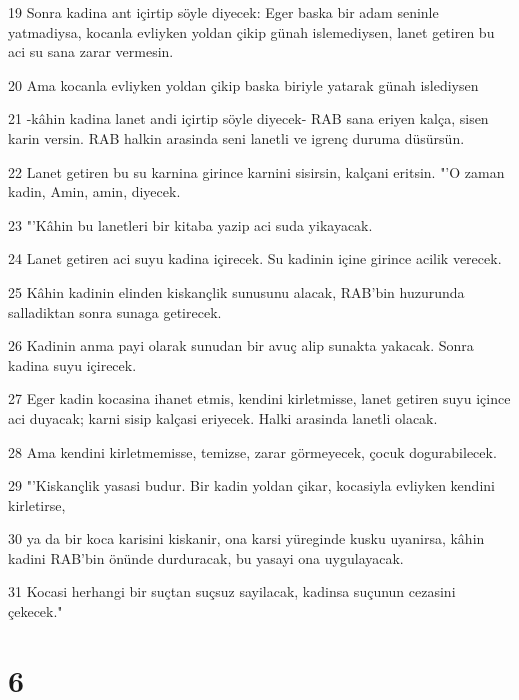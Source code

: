 \par 19 Sonra kadina ant içirtip söyle diyecek: Eger baska bir adam seninle yatmadiysa, kocanla evliyken yoldan çikip günah islemediysen, lanet getiren bu aci su sana zarar vermesin.
\par 20 Ama kocanla evliyken yoldan çikip baska biriyle yatarak günah islediysen
\par 21 -kâhin kadina lanet andi içirtip söyle diyecek- RAB sana eriyen kalça, sisen karin versin. RAB halkin arasinda seni lanetli ve igrenç duruma düsürsün.
\par 22 Lanet getiren bu su karnina girince karnini sisirsin, kalçani eritsin. "'O zaman kadin, Amin, amin, diyecek.
\par 23 "'Kâhin bu lanetleri bir kitaba yazip aci suda yikayacak.
\par 24 Lanet getiren aci suyu kadina içirecek. Su kadinin içine girince acilik verecek.
\par 25 Kâhin kadinin elinden kiskançlik sunusunu alacak, RAB'bin huzurunda salladiktan sonra sunaga getirecek.
\par 26 Kadinin anma payi olarak sunudan bir avuç alip sunakta yakacak. Sonra kadina suyu içirecek.
\par 27 Eger kadin kocasina ihanet etmis, kendini kirletmisse, lanet getiren suyu içince aci duyacak; karni sisip kalçasi eriyecek. Halki arasinda lanetli olacak.
\par 28 Ama kendini kirletmemisse, temizse, zarar görmeyecek, çocuk dogurabilecek.
\par 29 "'Kiskançlik yasasi budur. Bir kadin yoldan çikar, kocasiyla evliyken kendini kirletirse,
\par 30 ya da bir koca karisini kiskanir, ona karsi yüreginde kusku uyanirsa, kâhin kadini RAB'bin önünde durduracak, bu yasayi ona uygulayacak.
\par 31 Kocasi herhangi bir suçtan suçsuz sayilacak, kadinsa suçunun cezasini çekecek."

\chapter{6}

